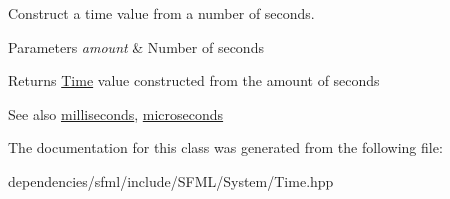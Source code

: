 Construct a time value from a number of seconds. 


\begin{DoxyParams}{Parameters}
{\em amount} & Number of seconds\\
\hline
\end{DoxyParams}
\begin{DoxyReturn}{Returns}
\hyperlink{classsf_1_1_time}{Time} value constructed from the amount of seconds
\end{DoxyReturn}
\begin{DoxySeeAlso}{See also}
\hyperlink{classsf_1_1_time_ae379d420bc07170668f51522023957b9}{milliseconds}, \hyperlink{classsf_1_1_time_a951fd7219641f1e8191887f5dfe0dc31}{microseconds} 
\end{DoxySeeAlso}


The documentation for this class was generated from the following file\+:\begin{DoxyCompactItemize}
\item 
dependencies/sfml/include/\+S\+F\+M\+L/\+System/Time.\+hpp\end{DoxyCompactItemize}
